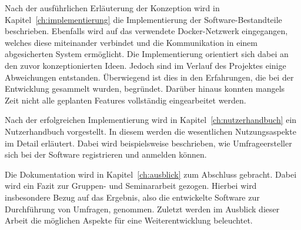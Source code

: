 Nach der ausführlichen Erläuterung der Konzeption wird in Kapitel~\vref{ch:implementierung} die Implementierung der Software-Bestandteile beschrieben.
Ebenfalls wird auf das verwendete Docker-Netzwerk eingegangen, welches diese miteinander verbindet und die Kommunikation in einem abgesicherten System ermöglicht.
Die Implementierung orientiert sich dabei an den zuvor konzeptionierten Ideen.
Jedoch sind im Verlauf des Projektes einige Abweichungen entstanden.
Überwiegend ist dies in den Erfahrungen, die bei der Entwicklung gesammelt wurden, begründet.
Darüber hinaus konnten mangels Zeit nicht alle geplanten Features vollständig eingearbeitet werden.

Nach der erfolgreichen Implementierung wird in Kapitel~\vref{ch:nutzerhandbuch} ein Nutzerhandbuch vorgestellt.
In diesem werden die wesentlichen Nutzungsaspekte im Detail erläutert.
Dabei wird beispielsweise beschrieben, wie Umfrageersteller sich bei der Software registrieren und anmelden können.

Die Dokumentation wird in Kapitel~\vref{ch:ausblick} zum Abschluss gebracht.
Dabei wird ein Fazit zur Gruppen- und Seminararbeit gezogen.
Hierbei wird insbesondere Bezug auf das Ergebnis, also die entwickelte Software zur Durchführung von Umfragen, genommen.
Zuletzt werden im Ausblick dieser Arbeit die möglichen Aspekte für eine Weiterentwicklung beleuchtet.
